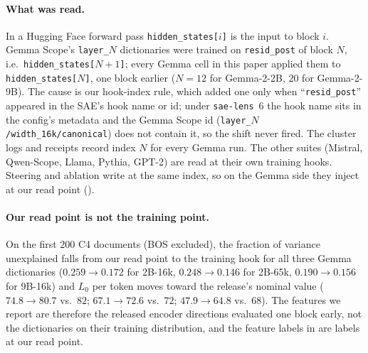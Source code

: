 \paragraph{What was read.} In a Hugging Face forward pass \texttt{hidden\_states[$i$]} is the input to
block $i$. Gemma Scope's \texttt{layer\_$N$} dictionaries were trained on \texttt{resid\_post} of block
$N$, i.e.\ \texttt{hidden\_states[$N{+}1$]}; every Gemma cell in this paper applied them to
\texttt{hidden\_states[$N$]}, one block earlier ($N=12$ for Gemma-2-2B, $20$ for Gemma-2-9B). The cause
is our hook-index rule, which added one only when ``\texttt{resid\_post}'' appeared in the SAE's hook
name or id; under \texttt{sae-lens}~6 the hook name sits in the config's metadata and the Gemma Scope id
(\texttt{layer\_$N$/width\_16k/canonical}) does not contain it, so the shift never fired. The cluster
logs and receipts record index $N$ for every Gemma run. The other suites (Mistral, Qwen-Scope, Llama,
Pythia, GPT-2) are read at their own training hooks. Steering and ablation write at the same index,
so on the Gemma side they inject at our read point ().

\paragraph{Our read point is not the training point.} On the first $200$ C4 documents (BOS excluded),
the fraction of variance unexplained falls from our read point to the training hook for all three
Gemma dictionaries ($0.259\to0.172$ for 2B-16k, $0.248\to0.146$ for 2B-65k, $0.190\to0.156$ for 9B-16k)
and $L_0$ per token moves toward the release's nominal value ($74.8\to80.7$ vs.\ $82$; $67.1\to72.6$
vs.\ $72$; $47.9\to64.8$ vs.\ $68$). The features we report are therefore the released encoder
directions evaluated one block early, not the dictionaries on their training distribution, and the
feature labels in  are labels at our read point.

